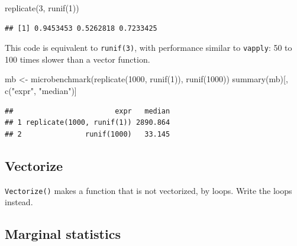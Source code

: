 \documentclass[
  12pt,
  american,
  a4paper,
  extrafontsizes,onecolumn,openright
  ]{memoir}
\newenvironment{Shaded}{\begin{snugshade}}{\end{snugshade}}
\newcommand{\DecValTok}[1]{\textcolor[rgb]{0.00,0.00,0.81}{#1}}
\newcommand{\FunctionTok}[1]{\textcolor[rgb]{0.00,0.00,0.00}{#1}}
\newcommand{\NormalTok}[1]{#1}
\newcommand{\OtherTok}[1]{\textcolor[rgb]{0.56,0.35,0.01}{#1}}
\newcommand{\StringTok}[1]{\textcolor[rgb]{0.31,0.60,0.02}{#1}}
\newlength{\rf}
\begin{document}
\scriptsize

\begin{Shaded}
\begin{Highlighting}[]
\FunctionTok{replicate}\NormalTok{(}\DecValTok{3}\NormalTok{, }\FunctionTok{runif}\NormalTok{(}\DecValTok{1}\NormalTok{))}
\end{Highlighting}
\end{Shaded}

\begin{verbatim}
## [1] 0.9453453 0.5262818 0.7233425
\end{verbatim}

\normalsize

This code is equivalent to \texttt{runif(3)}, with performance similar to \texttt{vapply}: 50 to 100 times slower than a vector function.

\scriptsize

\begin{Shaded}
\begin{Highlighting}[]
\NormalTok{mb }\OtherTok{\textless{}{-}} \FunctionTok{microbenchmark}\NormalTok{(}\FunctionTok{replicate}\NormalTok{(}\DecValTok{1000}\NormalTok{, }\FunctionTok{runif}\NormalTok{(}\DecValTok{1}\NormalTok{)), }\FunctionTok{runif}\NormalTok{(}\DecValTok{1000}\NormalTok{))}
\FunctionTok{summary}\NormalTok{(mb)[, }\FunctionTok{c}\NormalTok{(}\StringTok{"expr"}\NormalTok{, }\StringTok{"median"}\NormalTok{)]}
\end{Highlighting}
\end{Shaded}

\begin{verbatim}
##                        expr   median
## 1 replicate(1000, runif(1)) 2890.864
## 2               runif(1000)   33.145
\end{verbatim}

\normalsize

\hypertarget{vectorize}{%
\subsection{Vectorize}\label{vectorize}}

\texttt{Vectorize()} makes a function that is not vectorized, by loops.
Write the loops instead.

\hypertarget{marginal-statistics}{%
\subsection{Marginal statistics}\label{marginal-statistics}}
\end{document}
